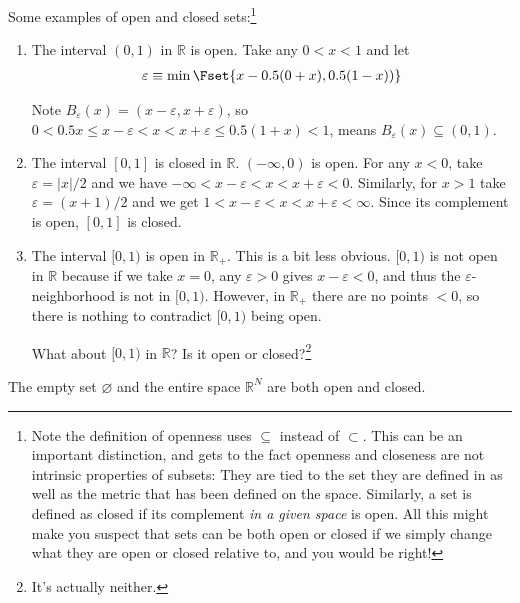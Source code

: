 \documentclass{article}
\begin{document}
Some examples of open and closed sets:\footnote{Note the definition of openness uses $\subseteq$ instead of $\subset$. This can be an important distinction, and gets to the fact openness and closeness are not intrinsic properties of subsets: They are tied to the set they are defined in as well as the metric that has been defined on the space. Similarly, a set is defined as closed if its complement \textit{in a given space} is open. All this might make you suspect that sets can be both open or closed if we simply change what they are open or closed relative to, and you would be right!}
\begin{enumerate}
  \item The interval $(0, 1)$ in $\mathbb{R}$ is open. Take any $0 < x < 1$ and let
    \begin{align*}
      \varepsilon \equiv \min\Fset{x - 0.5 (0 + x), 0.5 (1 - x))}
    \end{align*}

    Note $B_{\varepsilon}(x) = (x - \varepsilon, x + \varepsilon)$, so $0 < 0.5x \le x - \varepsilon < x < x + \varepsilon \le 0.5(1 + x) < 1$, means $B_{\varepsilon}(x) \subseteq (0, 1)$.

  \item The interval $[0, 1]$ is closed in $\mathbb{R}$. $(-\infty, 0)$ is open. For any $x < 0$, take $\varepsilon = |x| / 2$ and we have $-\infty < x - \varepsilon < x < x + \varepsilon < 0$. Similarly, for $x > 1$ take $\varepsilon = (x + 1) / 2$ and we get $1 < x - \varepsilon < x < x + \varepsilon < \infty$. Since its complement is open, $[0, 1]$ is closed.

  \item The interval $[0, 1)$ is open in $\mathbb{R}_+$. This is a bit less obvious. $[0, 1)$ is not open in $\mathbb{R}$ because if we take $x = 0$, any $\varepsilon > 0$ gives $x - \varepsilon < 0$, and thus the $\varepsilon$-neighborhood is not in $[0, 1)$. However, in $\mathbb{R}_+$ there are no points $< 0$, so there is nothing to contradict $[0, 1)$ being open.

    What about $[0, 1)$ in $\mathbb{R}$? Is it open or closed?\footnote{It's actually neither.}
\end{enumerate}

\begin{claim}
  The empty set $\varnothing$ and the entire space $\mathbb{R}^N$ are both open and closed.
\end{claim}
\end{document}
